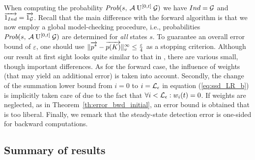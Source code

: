 \documentclass{entcs}
\newcommand{\SubSection}[1]{\subsection{#1}}
\begin{document}
		When computing the probability $\mbox{\it Prob}(s, \: \mathcal{A} \: \mathrm{U}^{[0,t]} \: \mathcal{G} )$ we have $Ind = \mathcal{G}$ and $\overrightarrow{1_{Ind}} = \overrightarrow{1_{\mathcal{G}}}$. Recall that the main difference with the forward algorithm is that we now employ a global model-checking procedure, i.e., probabilities $\mbox{\it Prob}(s, \: \mathcal{A} \: \mathrm{U}^{[0,t]} \: \mathcal{G} )$ are determined for \emph{all} states $s$. To guarantee an overall error bound of $\varepsilon$, one should use $\lVert  \overrightarrow{p^{*}} - \overrightarrow{p(K)}  \rVert_{v}^{\infty} \leq \frac{\varepsilon}{4}$ as a stopping criterion.  Although our result at first sight looks quite similar to that in \cite{YounesKNP_STTT05}, there are various small, though important differences.  As for the forward case, the influence of weights (that may yield an additional error) is taken into account.  Secondly, the change of the summation lower bound from $i=0$ to $i=\mathcal{L}_{\epsilon}$ in equation (\ref{eq:ssd_LR_b}) is implicitly taken care of due to the fact that $\forall i < \mathcal{L}_{\epsilon} : w_{i}(t) = 0$. If weights are neglected, as in Theorem~\ref{th:error_bwd_initial}, an error bound is obtained that is too liberal. Finally, we remark that the steady-state detection error is one-sided for backward computations.

	\SubSection{Summary of results}
\end{document}
